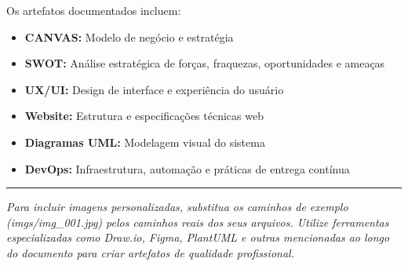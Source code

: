 \documentclass[11pt,a4paper]{article}
\begin{document}
Os artefatos documentados incluem:
\begin{itemize}
    \item \textbf{CANVAS:} Modelo de negócio e estratégia
    \item \textbf{SWOT:} Análise estratégica de forças, fraquezas, oportunidades e ameaças
    \item \textbf{UX/UI:} Design de interface e experiência do usuário
    \item \textbf{Website:} Estrutura e especificações técnicas web
    \item \textbf{Diagramas UML:} Modelagem visual do sistema
    \item \textbf{DevOps:} Infraestrutura, automação e práticas de entrega contínua
\end{itemize}

\vspace{1cm}
\noindent\rule{\textwidth}{0.5pt}
\vspace{0.3cm}

\noindent\textit{Para incluir imagens personalizadas, substitua os caminhos de exemplo (imgs/img\_001.jpg) pelos caminhos reais dos seus arquivos. Utilize ferramentas especializadas como Draw.io, Figma, PlantUML e outras mencionadas ao longo do documento para criar artefatos de qualidade profissional.}

\newpage
{}


\end{document}

